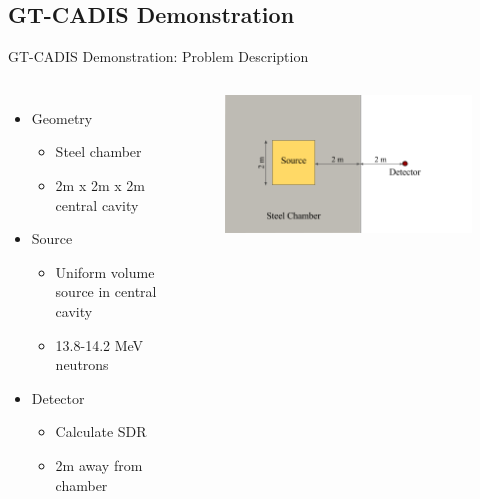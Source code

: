 \documentclass{beamer}
\begin{document}
\subsection{GT-CADIS Demonstration}
\begin{frame}{GT-CADIS Demonstration: Problem Description}
	\begin{columns}
           \begin{itemize}
		   \item{Geometry}
			   \begin{itemize}
				   \item{Steel chamber}
				   \item{2m x 2m x 2m central cavity}
			   \end{itemize}
		   \item{Source}
			   \begin{itemize}
				   \item{Uniform volume source in central cavity}
				   \item{13.8-14.2 MeV neutrons}
			   \end{itemize}
		   \item{Detector}
			   \begin{itemize}
			   \item{Calculate SDR}
			   \item{2m away from chamber}
			   \end{itemize}
	   \end{itemize}
		\begin{figure}
		\centering
		\includegraphics[scale=0.40]{orig_geom_pres.png}
                \end{figure}
	\end{columns}
\end{frame}
\end{document}
